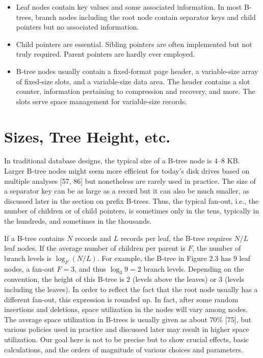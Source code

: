 \begin{itemize}
\item
  Leaf nodes contain key values and some associated information. In most
  B-trees, branch nodes including the root node contain separator keys
  and child pointers but no associated information.
\item
  Child pointers are essential. Sibling pointers are often implemented
  but not truly required. Parent pointers are hardly ever employed.
\item
  B-tree nodes usually contain a fixed-format page header, a
  variable-size array of fixed-size slots, and a variable-size data
  area. The header contains a slot counter, information pertaining to
  compression and recovery, and more. The slots serve space management
  for variable-size records.
\end{itemize}

\hypertarget{sizes-tree-height-etc.}{%
\section{Sizes, Tree Height, etc.}\label{sizes-tree-height-etc.}}

In traditional database designs, the typical size of a B-tree node is
4--8 KB. Larger B-tree nodes might seem more efficient for today's disk
drives based on multiple analyses {[}57, 86{]} but nonetheless are
rarely used in practice. The size of a separator key can be as large as
a record but it can also be much smaller, as discussed later in the
section on prefix B-trees. Thus, the typical fan-out, i.e., the number
of children or of child pointers, is sometimes only in the tens,
typically in the hundreds, and sometimes in the thousands.

If a B-tree contains $N$ records and $L$ records per leaf, the
B-tree requires $N/L$ leaf nodes. If the average number of children
per parent is $F$, the number of branch levels is
$\log_F(N/L)$. For example, the B-tree in
Figure 2.3 has 9 leaf nodes, a fan-out $F = 3$, and thus
$\log_3 9 = 2$ branch levels. Depending on the convention,
the height of this B-tree is $2$ (levels above the leaves) or $3$ (levels
including the leaves). In order to reflect the fact that the root node
usually has a different fan-out, this expression is rounded up. In fact,
after some random insertions and deletions, space utilization in the
nodes will vary among nodes. The average space utilization in B-trees is
usually given as about 70\% {[}75{]}, but various policies used in
practice and discussed later may result in higher space utilization. Our
goal here is not to be precise but to show crucial effects, basic
calculations, and the orders of magnitude of various choices and
parameters.

